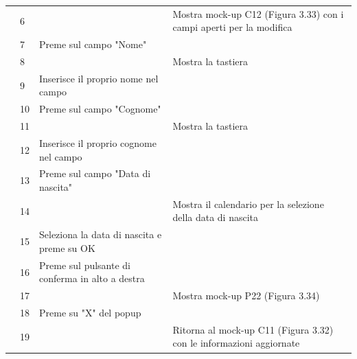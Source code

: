 \begin{longtable}{|C{3.0cm}|C{1.3cm}|L{5.2cm}|L{5.2cm}|}
                        & 6
                        & 
                        & Mostra mock-up C12 (Figura 3.33) con i campi aperti per la modifica\\
                        & 7
                        & Preme sul campo "Nome"
                        & \\
                        & 8
                        & 
                        & Mostra la tastiera\\
                        & 9
                        & Inserisce il proprio nome nel campo
                        & \\
                        & 10
                        & Preme sul campo "Cognome"
                        & \\
                        & 11
                        & 
                        & Mostra la tastiera\\
                        & 12
                        & Inserisce il proprio cognome nel campo
                        & \\
                        & 13
                        & Preme sul campo "Data di nascita"
                        & \\
                        & 14
                        & 
                        & Mostra il calendario per la selezione della data di nascita\\
                        & 15
                        & Seleziona la data di nascita e preme su OK
                        & \\
                        & 16
                        & Preme sul pulsante di conferma in alto a destra
                        & \\
                        & 17
                        & 
                        & Mostra mock-up P22 (Figura 3.34)\\
                        & 18
                        & Preme su "X" del popup
                        & \\
                        & 19
                        & 
                        & Ritorna al mock-up C11 (Figura 3.32) con le informazioni aggiornate\\

\end{longtable}
